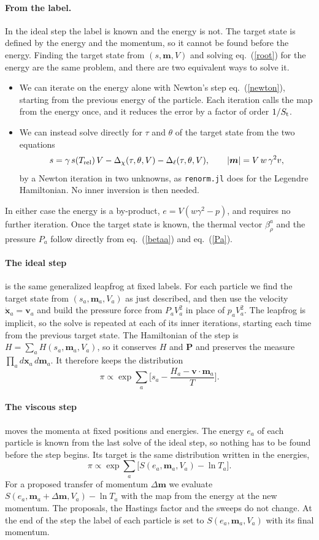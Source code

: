 \documentclass[11pt,aps,preprint,nofootinbib,superscriptaddress,tightenlines]{revtex4-2}
\def\st{\begin{equation}}
\def\stp{\end{equation}}
\def\Eq#1{eq.~(\ref{#1})}
\let\oldparagraph\paragraph
\renewcommand{\paragraph}{\par\bigskip\oldparagraph}
\begin{document}
\paragraph{From the label.}  In the ideal step the label is known and the energy is not.  The target state is defined by the energy and the
momentum, so it cannot be found before the energy.  Finding the target state from $(s,\bm m,V)$ and solving \Eq{root} for the energy are the same
problem, and there are two equivalent ways to solve it.
\begin{itemize}
\item We can iterate on the energy alone with Newton's step \Eq{newton}, starting from the previous energy of the particle.  Each iteration calls the
  map from the energy once, and it reduces the error by a factor of order $1/S_{\rm t}$.
\item We can instead solve directly for $\tau$ and $\theta$ of the target state from the two equations
  \st
  s=\gamma\,s(T_{\rm rel})\,V-\Delta_\chi(\tau,\theta,V)-\Delta_\ell(\tau,\theta,V),\qquad |\bm m|=V\,w\,\gamma^2v ,
  \stp
  by a Newton iteration in two unknowns, as \nolinkurl{renorm.jl} does for the Legendre Hamiltonian.  No inner inversion is then needed.
\end{itemize}
In either case the energy is a by-product, $e=V(w\gamma^2-p)$, and requires no further iteration.  Once the target state is known, the thermal vector
$\beta^a_\rho$ and the pressure $P_a$ follow directly from \Eq{betaa} and \Eq{Pa}.

\paragraph{The ideal step} is the same generalized leapfrog at fixed labels.  For each particle we find the target state from $(s_a,\bm m_a,V_a)$ as
just described, and then use the velocity $\dot{\bm x}_a=\bm v_a$ and build the pressure force from $P_aV_a^2$ in place of $p_aV_a^2$.  The leapfrog is
implicit, so the solve is repeated at each of its inner iterations, starting each time from the previous target state.  The Hamiltonian of the step
is $H=\sum_aH(s_a,\bm m_a,V_a)$, so it conserves $H$ and $\bm P$ and preserves the measure $\prod_ad\bm x_a\,d\bm m_a$.  It therefore keeps the
distribution
\st
\pi\propto\exp\sum_a\Big[s_a-\frac{H_a-\bm v\cdot\bm m_a}T\Big] .
\stp

\paragraph{The viscous step} moves the momenta at fixed positions and energies.  The energy $e_a$ of each particle is known from the last solve of
the ideal step, so nothing has to be found before the step begins.  Its target is the same distribution written in the energies,
\st
\pi\propto\exp\sum_a\Big[S(e_a,\bm m_a,V_a)-\ln T_a\Big] .
\stp
For a proposed transfer of momentum $\Delta\bm m$ we evaluate $S(e_a,\bm m_a+\Delta\bm m,V_a)-\ln T_a$ with the map from the energy at the new
momentum.  The proposals, the Hastings factor and the sweeps do not change.  At the end of the step the label of each particle is set to
$S(e_a,\bm m_a,V_a)$ with its final momentum.
\end{document}
